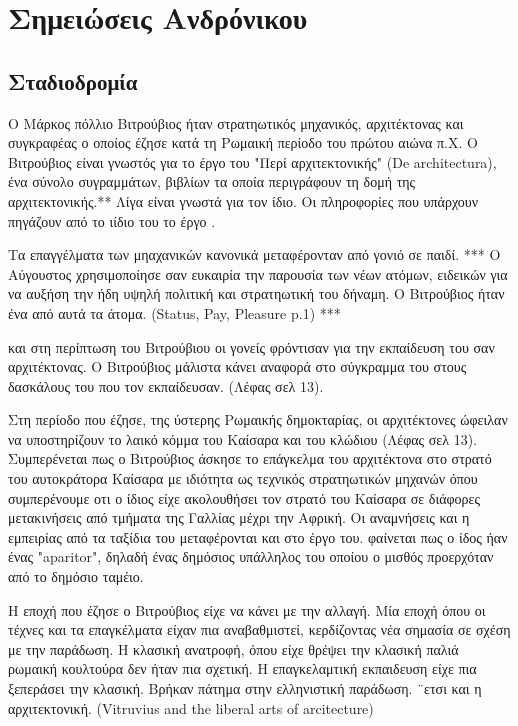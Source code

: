 
\section{Σημειώσεις Ανδρόνικου}

\subsection{Σταδιοδρομία}

Ο Μάρκος πόλλιο Βιτρούβιος ήταν στρατηωτικός μηχανικός, αρχιτέκτονας και συγκραφέας ο οποίος έζησε κατά τη Ρωμαική περίοδο του πρώτου αιώνα π.Χ. Ο Βιτρούβιος είναι γνωστός για το έργο του "Περί αρχιτεκτονικής" (De architectura), ένα σύνολο συγραμμάτων, βιβλίων τα οποία περιγράφουν τη δομή της αρχιτεκτονικής.** Λίγα είναι γνωστά για τον ίδιο. Οι πληροφορίες που υπάρχουν πηγάζουν από το ιίδιο του το έργο \cite[σ.~390]{masterson_status_2004}.

Τα επαγγέλματα των μηαχανικών κανονικά μεταφέρονταν από γονιό σε παιδί.  *** 
Ο Αύγουστος χρησιμοποίησε σαν ευκαιρία την παρουσία των νέων ατόμων, ειδεικών για να αυξήση την ήδη υψηλή πολιτική και στρατηωτική του δήναμη. Ο Βιτρούβιος ήταν ένα από αυτά τα άτομα. (Status, Pay, Pleasure p.1) ***

και στη περίπτωση του Βιτρούβιου οι γονείς φρόντισαν για την εκπαίδευση του σαν αρχιτέκτονας. Ο Βιτρούβιος μάλιστα κάνει αναφορά στο σύγκραμμα του στους δασκάλους του που τον εκπαίδευσαν. (Λέφας σελ 13).

Στη περίοδο που έζησε, της ύστερης Ρωμαικής δημοκταρίας, οι αρχιτέκτονες ώφειλαν να υποστηρίζουν το λαικό κόμμα του Καίσαρα και του κλώδιου (Λέφας σελ 13). Συμπερένεται πως ο Βιτρούβιος άσκησε το επάγκελμα του αρχιτέκτονα στο στρατό του αυτοκράτορα Καίσαρα με ιδιότητα ως τεχνικός στρατηωτικών μηχανών όπου συμπερένουμε οτι ο ίδιος είχε ακολουθήσει τον στρατό του Καίσαρα σε διάφορες μετακινήσεις από τμήματα της Γαλλίας μέχρι την Αφρική. Οι αναμνήσεις και η εμπειρίας από τα ταξίδια του μεταφέρονται και στο έργο του. φαίνεται πως ο ίδος ήαν ένας "aparitor", δηλαδή ένας δημόσιος υπάλληλος του οποίου ο μισθός προερχόταν από το δημόσιο ταμέιο.

Η εποχή που έζησε ο Βιτρούβιος είχε να κάνει με την αλλαγή. Μία εποχή όπου οι τέχνες και τα επαγκέλματα είχαν πια αναβαθμιστεί, κερδίζοντας νέα σημασία σε σχέση με την παράδωση. Η κλασική ανατροφή, όπου είχε θρέψει την κλασική παλιά ρωμαική κουλτούρα δεν ήταν πια σχετική. Η επαγκελαμτική εκπαιδευση είχε πια ξεπεράσει την κλασική. Βρήκαν πάτημα στην ελληνιστική παράδωση. ¨ετσι και η αρχιτεκτονική. (Vitruvius and the liberal arts of arcitecture)

